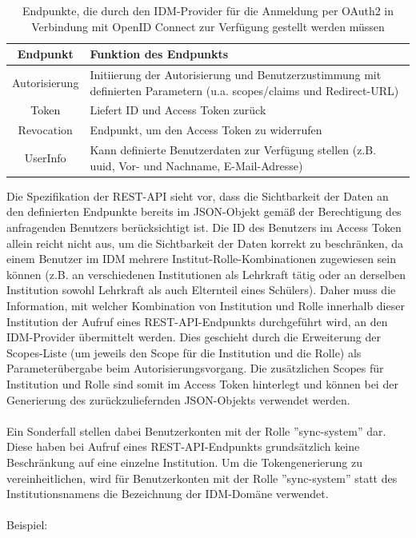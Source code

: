 \begin{table}[htb]
    \begin{tabularx}{\textwidth}{|c|X|}
        \hline
\textbf{Endpunkt} & \textbf{Funktion des Endpunkts} \\ \hline
Autorisierung & Initiierung der Autorisierung und Benutzerzustimmung mit definierten Parametern (u.a. scopes/claims und Redirect-URL) \\ \hline
Token & Liefert ID und Access Token zurück \\ \hline
Revocation & Endpunkt, um den Access Token zu widerrufen \\ \hline
UserInfo & Kann definierte Benutzerdaten zur Verfügung stellen (z.B. uuid, Vor- und Nachname, E-Mail-Adresse) \\ \hline
    \end{tabularx}

        \caption{Endpunkte, die durch den IDM-Provider für die Anmeldung per OAuth2 in Verbindung mit OpenID Connect zur Verfügung gestellt werden müssen}
        \label{tab:auth:endpoints}
\end{table}

Die Spezifikation der REST-API sieht vor, dass die Sichtbarkeit der Daten an den definierten Endpunkte bereits im JSON-Objekt gemäß der Berechtigung des anfragenden Benutzers berücksichtigt ist. 
Die ID des Benutzers im Access Token allein reicht nicht aus, um die Sichtbarkeit der Daten korrekt zu beschränken, da einem Benutzer im IDM mehrere Institut-Rolle-Kombinationen zugewiesen sein können (z.B. an verschiedenen Institutionen als Lehrkraft tätig oder an derselben Institution sowohl Lehrkraft als auch Elternteil eines Schülers). 
Daher muss die Information, mit welcher Kombination von Institution und Rolle innerhalb dieser Institution der Aufruf eines REST-API-Endpunkts durchgeführt wird, an den IDM-Provider übermittelt werden. 
Dies geschieht durch die Erweiterung der Scopes-Liste (um jeweils den Scope für die Institution und die Rolle) als Parameterübergabe beim Autorisierungsvorgang. 
Die zusätzlichen Scopes für Institution und Rolle sind somit im Access Token hinterlegt und können bei der Generierung des zurückzuliefernden JSON-Objekts verwendet werden. \\
\\
Ein Sonderfall stellen dabei Benutzerkonten mit der Rolle ''sync-system'' dar. 
Diese haben bei Aufruf eines REST-API-Endpunkts grundsätzlich keine Beschränkung auf eine einzelne Institution. 
Um die Tokengenerierung zu vereinheitlichen, wird für Benutzerkonten mit der Rolle ''sync-system'' statt des Institutionsnamens die Bezeichnung der IDM-Domäne verwendet.\\
\\
Beispiel:

